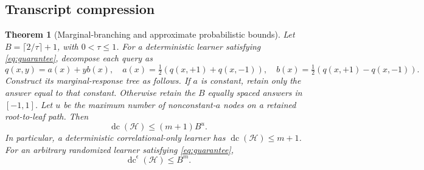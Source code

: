 \documentclass[11pt]{article}
\newtheorem{theorem}{Theorem}
\DeclareMathOperator{\dc}{dc}
\newcommand{\1}{\mathbf 1}
\newcommand{\cH}{\mathcal H}
\begin{document}
\subsection{Transcript compression}
\begin{samepage}
\begin{theorem}[Marginal-branching and approximate probabilistic bounds]\label{thm:tree}
Let $B=\lceil2/\tau\rceil+1$, with $0<\tau\leq1$. For a deterministic learner satisfying \eqref{eq:guarantee}, decompose each query as
\[
 q(x,y)=a(x)+yb(x),\quad
 a(x)=\tfrac12(q(x,+1)+q(x,-1)),\quad
 b(x)=\tfrac12(q(x,+1)-q(x,-1)).
\]
Construct its marginal-response tree as follows. If $a$ is constant, retain only the answer equal to that constant. Otherwise retain the $B$ equally spaced answers in $[-1,1]$. Let $u$ be the maximum number of nonconstant-$a$ nodes on a retained root-to-leaf path. Then
\begin{equation}\label{eq:tree}
 \dc(\cH)\leq(m+1)B^u.
\end{equation}
In particular, a deterministic correlational-only learner has $\dc(\cH)\leq m+1$.
For an arbitrary randomized learner satisfying \eqref{eq:guarantee},
\begin{equation}\label{eq:approx}
 \dc^{\epsilon}(\cH)\leq B^m.
\end{equation}
\end{theorem}
\end{samepage}
\end{document}
